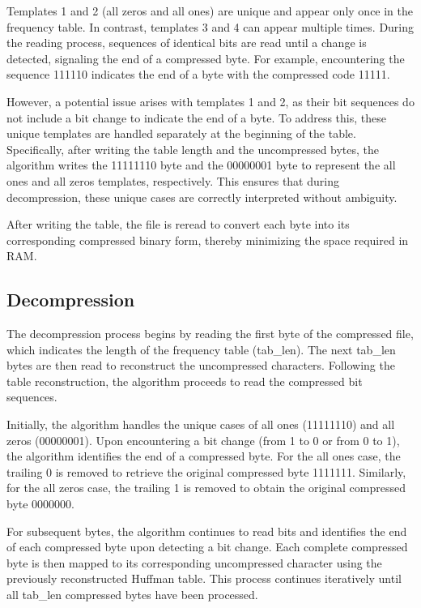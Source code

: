 \documentclass[12pt,oneside,letterpaper,english]{article}
\begin{document}
Templates 1 and 2 (all zeros and all ones) are unique and appear only once in the frequency table. In contrast, templates 3 and 4 can appear multiple times. During the reading process, sequences of identical bits are read until a change is detected, signaling the end of a compressed byte. For example, encountering the sequence 111110 indicates the end of a byte with the compressed code 11111.

However, a potential issue arises with templates 1 and 2, as their bit sequences do not include a bit change to indicate the end of a byte. To address this, these unique templates are handled separately at the beginning of the table. Specifically, after writing the table length and the uncompressed bytes, the algorithm writes the 11111110 byte and the 00000001 byte to represent the all ones and all zeros templates, respectively. This ensures that during decompression, these unique cases are correctly interpreted without ambiguity.

After writing the table, the file is reread to convert each byte into its corresponding compressed binary form, thereby minimizing the space required in RAM.

\subsection*{Decompression}
The decompression process begins by reading the first byte of the compressed file, which indicates the length of the frequency table (tab\_len). The next tab\_len bytes are then read to reconstruct the uncompressed characters. Following the table reconstruction, the algorithm proceeds to read the compressed bit sequences.

Initially, the algorithm handles the unique cases of all ones (11111110) and all zeros (00000001). Upon encountering a bit change (from 1 to 0 or from 0 to 1), the algorithm identifies the end of a compressed byte. For the all ones case, the trailing 0 is removed to retrieve the original compressed byte 1111111. Similarly, for the all zeros case, the trailing 1 is removed to obtain the original compressed byte 0000000.

For subsequent bytes, the algorithm continues to read bits and identifies the end of each compressed byte upon detecting a bit change. Each complete compressed byte is then mapped to its corresponding uncompressed character using the previously reconstructed Huffman table. This process continues iteratively until all tab\_len compressed bytes have been processed.
\end{document}
